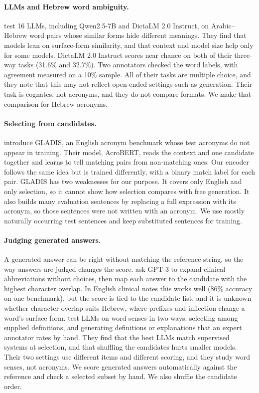 \documentclass[11pt]{article}
\begin{document}
\paragraph{LLMs and Hebrew word ambiguity.}
\citet{liang2026cognates} test 16 LLMs, including Qwen2.5-7B and DictaLM 2.0 Instruct, on Arabic--Hebrew word pairs whose similar forms hide different meanings. They find that models lean on surface-form similarity, and that context and model size help only for some models. DictaLM 2.0 Instruct scores near chance on both of their three-way tasks (31.6\% and 32.7\%). Two annotators checked the word labels, with agreement measured on a 10\% sample. All of their tasks are multiple choice, and they note that this may not reflect open-ended settings such as generation. Their task is cognates, not acronyms, and they do not compare formats. We make that comparison for Hebrew acronyms.

\paragraph{Selecting from candidates.}
\citet{chen2023gladis} introduce GLADIS, an English acronym benchmark whose test acronyms do not appear in training. Their model, AcroBERT, reads the context and one candidate together and learns to tell matching pairs from non-matching ones. Our encoder follows the same idea but is trained differently, with a binary match label for each pair. GLADIS has two weaknesses for our purpose. It covers only English and only selection, so it cannot show how selection compares with free generation. It also builds many evaluation sentences by replacing a full expression with its acronym, so those sentences were not written with an acronym. We use mostly naturally occurring test sentences and keep substituted sentences for training.

\paragraph{Judging generated answers.}
A generated answer can be right without matching the reference string, so the way answers are judged changes the score. \citet{agrawal2022large} ask GPT-3 to expand clinical abbreviations without choices, then map each answer to the candidate with the highest character overlap. In English clinical notes this works well (86\% accuracy on one benchmark), but the score is tied to the candidate list, and it is unknown whether character overlap suits Hebrew, where prefixes and inflection change a word's surface form. \citet{meconi2025large} test LLMs on word senses in two ways: selecting among supplied definitions, and generating definitions or explanations that an expert annotator rates by hand. They find that the best LLMs match supervised systems at selection, and that shuffling the candidates hurts smaller models. Their two settings use different items and different scoring, and they study word senses, not acronyms. We score generated answers automatically against the reference and check a selected subset by hand. We also shuffle the candidate order.
\end{document}
